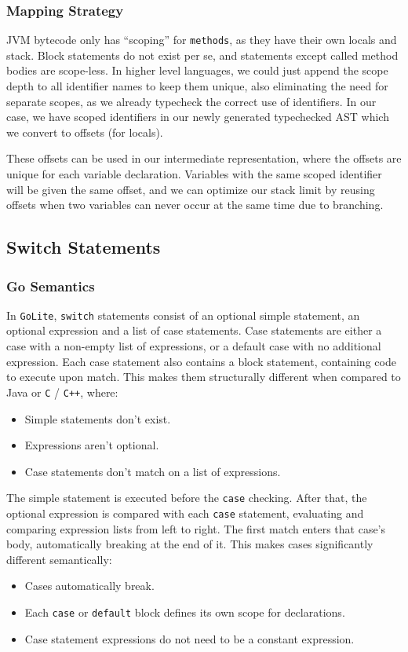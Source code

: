 \documentclass[11pt]{article}
\begin{document}
\subsubsection{Mapping Strategy}
\label{sec:org9b58fa9}
JVM bytecode only has ``scoping'' for \texttt{methods}, as they have
their own locals and stack. Block statements do not exist per se,
and statements except called method bodies are scope-less. In
higher level languages, we could just append the scope depth to
all identifier names to keep them unique, also eliminating the
need for separate scopes, as we already typecheck the correct use
of identifiers. In our case, we have scoped identifiers in our
newly generated typechecked AST which we convert to offsets (for
locals).

These offsets can be used in our intermediate representation,
where the offsets are unique for each variable
declaration. Variables with the same scoped identifier will be
given the same offset, and we can optimize our stack limit by
reusing offsets when two variables can never occur at the same
time due to branching.
\subsection{Switch Statements}
\label{sec:orgc2029ba}
\subsubsection{Go Semantics}
\label{sec:org5f28246}
In \texttt{GoLite}, \texttt{switch} statements consist of an optional simple
statement, an optional expression and a list of case
statements. Case statements are either a case with a non-empty
list of expressions, or a default case with no additional
expression.  Each case statement also contains a block statement,
containing code to execute upon match. This makes them
structurally different when compared to Java or \texttt{C} / \texttt{C++},
where:
\begin{itemize}[noitemsep]
\item Simple statements don't exist.
\item Expressions aren't optional.
\item Case statements don't match on a list of expressions.
\end{itemize}
The simple statement is executed before the \texttt{case} checking.
After that, the optional expression is compared with each \texttt{case}
statement, evaluating and comparing expression lists from left to
right. The first match enters that case's body, automatically
breaking at the end of it. This makes cases significantly
different semantically:
\begin{itemize}[noitemsep]
\item Cases automatically break.
\item Each \texttt{case} or \texttt{default} block defines its own scope for declarations.
\item Case statement expressions do not need to be a constant expression.
\end{itemize}
\end{document}
